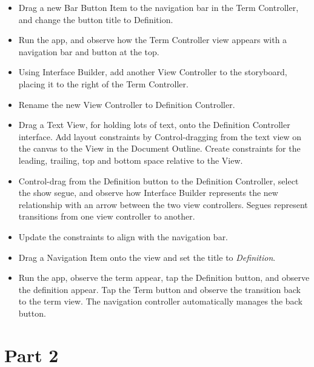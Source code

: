 \documentclass[a4paper,11pt]{scrartcl}
\begin{document}
\begin{itemize}
\item Drag a new Bar Button Item to the navigation bar in the Term Controller, and change the button title to Definition.
\item Run the app, and observe how the Term Controller view appears with a navigation bar and button at the top.
\item Using Interface Builder, add another View Controller to the storyboard, placing it to the right of the Term Controller.
\item Rename the new View Controller to Definition Controller.
\item Drag a Text View, for holding lots of text, onto the Definition Controller interface. Add layout constraints by Control-dragging from the text view on the canvas to the View in the Document Outline. Create constraints for the leading, trailing, top and bottom space relative to the View.
\item Control-drag from the Definition button to the Definition Controller, select the show segue, and observe how Interface Builder represents the new relationship with an arrow between the two view controllers. Segues represent transitions from one view controller to another.
\item Update the constraints to align with the navigation bar.
\item Drag a Navigation Item onto the view and set the title to \textit{Definition}.
\item Run the app, observe the term appear, tap the Definition button, and observe the definition appear. Tap the Term button and observe the transition back to the term view. The navigation controller automatically manages the back button.
\end{itemize}

\section*{Part 2}
\end{document}
